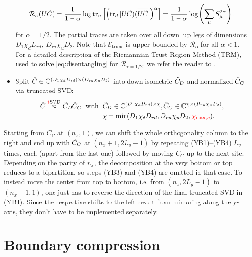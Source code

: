 \begin{itemize}
	\begin{equation}
		\mathcal{R}_{\alpha}(U \Tilde{C}) 
		=
		\frac{1}{1 - \alpha} \log \tr_{u} \left[ \left(\tr_{d} \vert U \Tilde{C} ) (\overline{U \Tilde{C}} \vert \right)^{\alpha} \right] 
		= 
		\frac{1}{1 - \alpha} \log \left( \sum_{\mu} S_{\mu}^{2 \alpha} \right),
	\end{equation}
	for $\alpha = 1/2$. The partial traces are taken over all down, up legs of dimensions $D_1 \chi_d D_{rd}$, $D_{ru} \chi_u D_2$. Note that $\mathcal{E}_{\text{trunc}}$ is upper bounded by $\mathcal{R}_{\alpha}$ for all $\alpha < 1$. For a detailed description of the Riemannian Trust-Region Method (TRM), used to solve \eqref{eq:disentangling} for $\mathcal{R}_{\alpha=1/2}$, we refer the reader to \cite{sappler2025diagonal, lin2022efficient}. 
	\item[\text{(YB4)}] Split $\Tilde{C} \in \mathbb{C}^{(D_1 \chi_d D_{rd}) \times (D_{ru} \chi_u D_2)}$ into down isometric $\Tilde{C}_D$ and normalized $\Tilde{C}_C$ via truncated SVD:
	\begin{align} \label{eq:tSVD_C_Tilde}
	\begin{split}
		\Tilde{C} \overset{\text{\textcolor{red}{t}SVD}}{\approx} \Tilde{C}_D \Tilde{C}_C
		\:\text{ with }\: 
		&\Tilde{C}_D \in \mathbb{C}^{(D_1 \chi_d D_{rd}) \times \chi}, 
		\Tilde{C}_C \in \mathbb{C}^{\chi \times (D_{ru} \chi_u D_2)}, \\
		&\chi = \text{min}(D_1 \chi_d D_{rd}, D_{ru} \chi_u D_2, \textcolor{red}{\chi_{\text{max},c}}).
	\end{split}
	\end{align}
\end{itemize} 
Starting from $C_C$ at $(n_x, 1)$, we can shift the whole orthogonality column to the right and end up with $\Tilde{C}_C$ at $(n_x+1, 2L_y - 1)$
by repeating (YB1)--(YB4) $L_y$ times, each (apart from the last one) followed by moving $C_C$ up to the next site. Depending on the parity of $n_x$, the decomposition at the very bottom or top reduces to a bipartition, so steps (YB3) and (YB4) are omitted in that case. To instead move the center from top to bottom, i.e. from $(n_x, 2L_y - 1)$ to $(n_x+1, 1)$, one just has to reverse the direction of the final truncated SVD in (YB4). Since the respective shifts to the left result from mirroring along the y-axis, they don't have to be implemented separately. \\


\newpage
\section{Boundary compression} \label{sec:bc}

